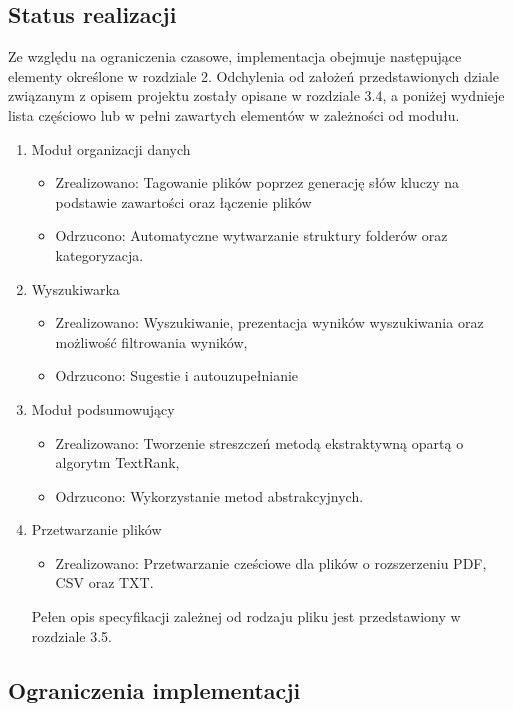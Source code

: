 \documentclass[12pt,a4paper,twoside]{article}
\begin{document}
\subsection{Status realizacji}
Ze względu na ograniczenia czasowe, implementacja obejmuje następujące elementy określone w rozdziale 2. Odchylenia od założeń przedstawionych dziale związanym z opisem projektu zostały opisane w rozdziale 3.4, a poniżej wydnieje lista częściowo lub w pełni zawartych elementów w zależności od modułu. 
\begin{enumerate}
	\item Moduł organizacji danych
	\begin{itemize}
		\item Zrealizowano: Tagowanie plików poprzez generację słów kluczy na podstawie zawartości oraz łączenie plików
		\item Odrzucono: Automatyczne wytwarzanie struktury folderów oraz kategoryzacja.
	\end{itemize}
	\item Wyszukiwarka
	\begin{itemize}
		\item Zrealizowano: Wyszukiwanie, prezentacja wyników wyszukiwania oraz możliwość filtrowania wyników,
		\item Odrzucono: Sugestie i autouzupełnianie
	\end{itemize}
	\item Moduł podsumowujący
	\begin{itemize}
		\item Zrealizowano: Tworzenie streszczeń metodą ekstraktywną opartą o algorytm TextRank,
		\item Odrzucono: Wykorzystanie metod abstrakcyjnych.
	\end{itemize}
	\item Przetwarzanie plików
	\begin{itemize}
		\item Zrealizowano: Przetwarzanie cześciowe dla plików o rozszerzeniu PDF, CSV oraz TXT.
	\end{itemize}
	Pełen opis specyfikacji zależnej od rodzaju pliku jest przedstawiony w rozdziale 3.5.
\end{enumerate}
\subsection{Ograniczenia implementacji}
\end{document}
